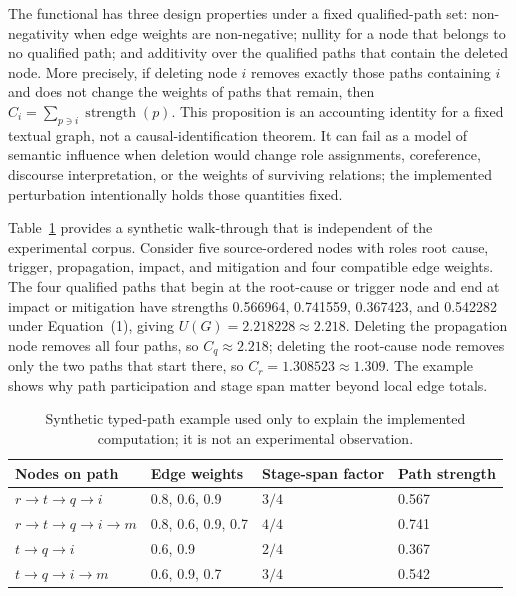 \documentclass[applsci,article,submit,moreauthors]{Definitions/mdpi}
\begin{document}
The functional has three design properties under a fixed qualified-path set: non-negativity when edge weights are non-negative; nullity for a node that belongs to no qualified path; and additivity over the qualified paths that contain the deleted node. More precisely, if deleting node $i$ removes exactly those paths containing $i$ and does not change the weights of paths that remain, then $C_i=\sum_{p\ni i}\operatorname{strength}(p)$. This proposition is an accounting identity for a fixed textual graph, not a causal-identification theorem. It can fail as a model of semantic influence when deletion would change role assignments, coreference, discourse interpretation, or the weights of surviving relations; the implemented perturbation intentionally holds those quantities fixed.

Table~\ref{tab:toy-path} provides a synthetic walk-through that is independent of the experimental corpus. Consider five source-ordered nodes with roles root cause, trigger, propagation, impact, and mitigation and four compatible edge weights. The four qualified paths that begin at the root-cause or trigger node and end at impact or mitigation have strengths 0.566964, 0.741559, 0.367423, and 0.542282 under Equation~(1), giving $U(G)=2.218228\approx2.218$. Deleting the propagation node removes all four paths, so $C_{q}\approx2.218$; deleting the root-cause node removes only the two paths that start there, so $C_{r}=1.308523\approx1.309$. The example shows why path participation and stage span matter beyond local edge totals.

\begin{table}[H]
\caption{Synthetic typed-path example used only to explain the implemented computation; it is not an experimental observation.}
\label{tab:toy-path}\centering\small
\begin{tabular}{llll}
\toprule
Nodes on path & Edge weights & Stage-span factor & Path strength\\
\midrule
$r\rightarrow t\rightarrow q\rightarrow i$ & 0.8, 0.6, 0.9 & $3/4$ & 0.567\\
$r\rightarrow t\rightarrow q\rightarrow i\rightarrow m$ & 0.8, 0.6, 0.9, 0.7 & $4/4$ & 0.741\\
$t\rightarrow q\rightarrow i$ & 0.6, 0.9 & $2/4$ & 0.367\\
$t\rightarrow q\rightarrow i\rightarrow m$ & 0.6, 0.9, 0.7 & $3/4$ & 0.542\\
\bottomrule
\end{tabular}
\end{table}
\end{document}
